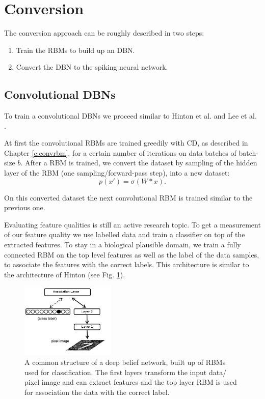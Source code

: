 \section{Conversion} \label{c:convappro}

The conversion approach can be roughly described in two steps:
\begin{enumerate}
\item Train the RBMs to build up an DBN.
\item Convert the DBN to the spiking neural network.
\end{enumerate}


\subsection{Convolutional DBNs} \label{c:convdbns}

To train a convolutional DBNs we proceed similar to Hinton et al. and Lee et al. \cite{hinton2006fast} \cite{lee2009convolutional}.

At first the convolutional RBMs are trained greedily with CD, as described in Chapter \ref{c:convrbm}, for a certain number of iterations on data batches of batch-size $b$.
After a RBM is trained, we convert the dataset by sampling of the hidden layer of the RBM (one sampling/forward-pass step), into a new dataset:
\[
p(x') = \sigma(W * x) .
\]

On this converted dataset the next convolutional RBM is trained similar to the previous one.

Evaluating feature qualities is still an active research topic.
To get a measurement of our feature quality we use labelled data and train a classifier on top of the extracted features.
To stay in a biological plausible domain, we train a fully connected RBM on the top level features as well as the label of the data samples, to associate the features with the correct labels.
This architecture is similar to the architecture of Hinton \cite{hinton2006fast} (see Fig. \ref{fig:dbnmnist}).

\begin{figure}
	\centering
    	\includegraphics[width=0.4\textwidth]{imgs/dbn_mnist.png} 
    \caption{A common structure of a deep belief network, built up of RBMs used for classification. The first layers transform the input data/ pixel image and can extract features and the top layer RBM is used for association the data with the correct label.}
	\label{fig:dbnmnist}
\end{figure}

